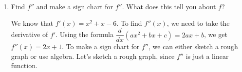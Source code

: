 \documentclass{article}
\begin{document}
\begin{enumerate}
\begin{enumerate}
\begin{solution}
      With both of these strategies, we find that $f'(x)$ is negative on the interval $(-3, 2)$ and positive
      on $(-\infty, -3) \cup (2, \infty)$. This tells us:
      \begin{itemize}
        \item $f$ is decreasing on $(-3, 2)$ because $f'$ is negative on that interval
        \item $f$ is increasing on $(-\infty, -3)$ and on $(2, \infty)$ because $f'$ is positive on those intervals
        \item $f$ has horizontal tangents at $x=-3$ and $x=2$ because $f'$ is zero there
      \end{itemize}
    \end{solution}

  \item
    \begin{problem}[\vfill]
      Find $f''$ and make a sign chart for $f''$. What does this tell you about $f$? 
    \end{problem}

    \begin{solution}
      We know that $f'(x) = x^2 + x - 6$. To find $f''(x)$, we need to take the derivative of $f'$. Using the
      formula $\dfrac{d}{dx}(ax^2 + bx + c) = 2ax + b$, we get $f''(x) = 2x+1$. To make a sign chart for $f''$,
      we can either sketch a rough graph or use algebra. Let's sketch a rough graph, since $f''$ is just a linear
      function.


\end{solution}
\end{enumerate}
\end{enumerate}
\end{document}
